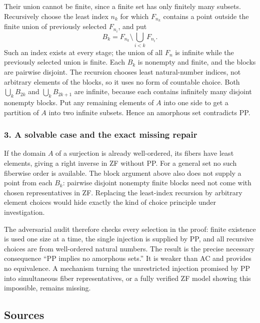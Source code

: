 \documentclass[11pt,a4paper]{article}
\begin{document}
Their union cannot be finite, since a finite set has only finitely many subsets. Recursively choose the least index $n_k$ for which $F_{n_k}$ contains a point outside the finite union of previously selected $F_{n_i}$, and put
\[B_k=F_{n_k}\setminus\bigcup_{i<k}F_{n_i}.\]
Such an index exists at every stage; the union of all $F_n$ is infinite while the previously selected union is finite. Each $B_k$ is nonempty and finite, and the blocks are pairwise disjoint. The recursion chooses least natural-number indices, not arbitrary elements of the blocks, so it uses no form of countable choice. Both $\bigcup_k B_{2k}$ and $\bigcup_k B_{2k+1}$ are infinite, because each contains infinitely many disjoint nonempty blocks. Put any remaining elements of $A$ into one side to get a partition of $A$ into two infinite subsets. Hence an amorphous set contradicts PP.

\subsubsection{3. A solvable case and the exact missing repair}
If the domain $A$ of a surjection is already well-ordered, its fibers have least elements, giving a right inverse in ZF without PP. For a general set no such fiberwise order is available. The block argument above also does not supply a point from each $B_k$: pairwise disjoint nonempty finite blocks need not come with chosen representatives in ZF. Replacing the least-index recursion by arbitrary element choices would hide exactly the kind of choice principle under investigation.

The adversarial audit therefore checks every selection in the proof: finite existence is used one size at a time, the single injection is supplied by PP, and all recursive choices are from well-ordered natural numbers. The result is the precise necessary consequence ``PP implies no amorphous sets.'' It is weaker than AC and provides no equivalence. A mechanism turning the unrestricted injection promised by PP into simultaneous fiber representatives, or a fully verified ZF model showing this impossible, remains missing.

\subsection{Sources}
\end{document}
